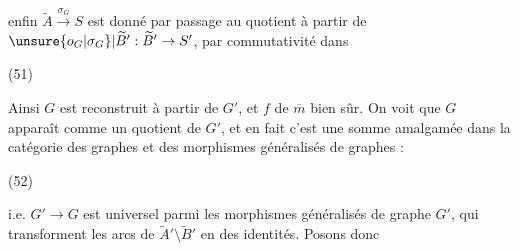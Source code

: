 enfin $\widetilde A\xrightarrow{\sigma_G}S$ est donné par passage au quotient à partir de $\unsure{o_G|\sigma_G}|\widetilde B':\widetilde B'\to S'$, par commutativité dans

(51)\quad{}

Ainsi $G$ est reconstruit à partir de $G'$, et $f$ de $\overline m$ bien sûr. On voit que $G$ apparaît comme un quotient de $G'$, et en fait c'est  une somme amalgamée dans la catégorie des graphes et des morphismes généralisés de graphes :

(52)\quad{}

i.e. $G'\longrightarrow G$ est universel parmi les morphismes généralisés de  graphe $G'$, qui transforment les arcs de $\widetilde A'\setminus\widetilde B'$ en des identités. Posons donc
